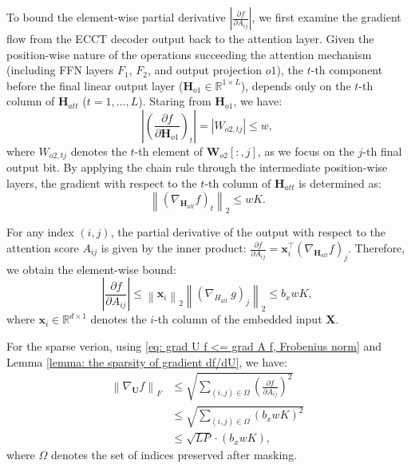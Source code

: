 \documentclass[lettersize,onecolumn]{IEEEtran}
\begin{document}

To bound the element-wise partial derivative $|\frac{\partial f}{\partial A_{ij}}|$, we first examine the gradient flow from the ECCT decoder output back to the attention layer. Given the position-wise nature of the operations succeeding the attention mechanism (including FFN layers $F_1$,  $F_2$, and output projection $o1$), the $t$-th component before the final linear output layer ($\mathbf{H}_{o1}\in \mathbb{R}^{1\times L}$), depends only on the $t$-th column of $\mathbf{H}_{att}$ ($t=1,\ldots,L$). Staring from $\mathbf{H}_{o1}$, we have:
\begin{equation}
    \left|\left(\frac{\partial f}{\partial \mathbf{H}_{o1}}\right)_{t}\right|=\left| W_{o2, tj}\right|\leq w,
\end{equation}
where $W_{o2, tj}$ denotes the $t$-th element of $\mathbf{W}_{o2}[:,j]$, as we focus on the $j$-th final output bit. By applying the chain rule through the intermediate position-wise layers, the gradient with respect to the $t$-th column of $\mathbf{H}_{att}$ is determined as:
\begin{equation}
    \left\| (\nabla_{\mathbf{H}_{att}}f)_t \right\|_2 \leq wK.
\end{equation}

For any index $(i,j)$, the partial derivative of the output with respect to the attention score $A_{ij}$ is given by the inner product: $\frac{\partial f}{\partial A_{ij}}=\mathbf{x}_{i}^{\top}(\nabla_{\mathbf{H}_{att}}f)_j$. Therefore, we obtain the element-wise bound:
\begin{equation}
    \left|\frac{\partial f}{\partial A_{i j}}\right| \leq\left\|\mathbf{x}_{i}\right\|_{2}\left\|\left(\nabla_{H_{\text {att }}} g\right)_{j}\right\|_{2}\leq b_x wK,
\end{equation}
where $\mathbf{x}_{i} \in \mathbb{R}^{d \times 1}$ denotes the $i$-th column of the embedded input $\mathbf{X}$.

For the sparse verion, using \eqref{eq: grad U f <= grad A f, Frobenius norm} and Lemma \ref{lemma: the sparsity of gradient df/dU}, we have:
\begin{equation}
\begin{aligned}
    \left\|\nabla_{\mathbf{U}} f\right\|_{F} &\leq \sqrt{\sum_{(i,j)\in \Omega} \left(\frac{\partial f}{\partial A_{i j}}\right)^{2}} \\
    &\leq \sqrt{\sum_{(i,j)\in \Omega}\left(b_x w K\right)^2} \\
    &\leq \sqrt{LP}\cdot (b_x w K),
\end{aligned}
\end{equation}
where $\Omega$ denotes the set of indices preserved after masking.
\end{document}
